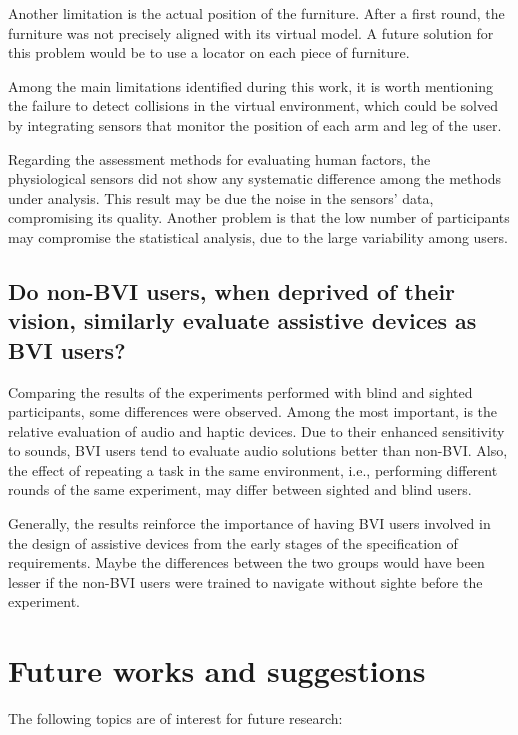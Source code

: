 Another limitation is the actual position of the furniture. After a first round, the furniture was not precisely aligned with its virtual model. A future solution for this problem would be to use a locator on each piece of furniture.

Among the main limitations identified during this work, it is worth mentioning the failure to detect collisions in the virtual environment, which could be solved by integrating sensors that monitor the position of each arm and leg of the user.

Regarding the assessment methods for evaluating human factors, the physiological sensors did not show any systematic difference among the methods under analysis. This result may be due the noise in the sensors' data, compromising its quality. Another problem is that the low number of participants may compromise the statistical analysis, due to the large variability among users.

\subsection*{Do non-BVI users, when deprived of their vision, similarly evaluate assistive devices as BVI users?}

Comparing the results of the experiments performed with blind and sighted participants, some differences were observed. Among the most important, is the relative evaluation of audio and haptic devices. Due to their enhanced sensitivity to sounds, BVI users tend to evaluate audio solutions better than non-BVI. Also, the effect of repeating a task in the same environment, i.e., performing different rounds of the same experiment, may differ between sighted and blind users.

Generally, the results reinforce the importance of having BVI users involved in the design of assistive devices from the early stages of the specification of requirements. Maybe the differences between the two groups would have been lesser if the non-BVI users were trained to navigate without sighte before the experiment.

\section{Future works and suggestions}

The following topics are of interest for future research:

